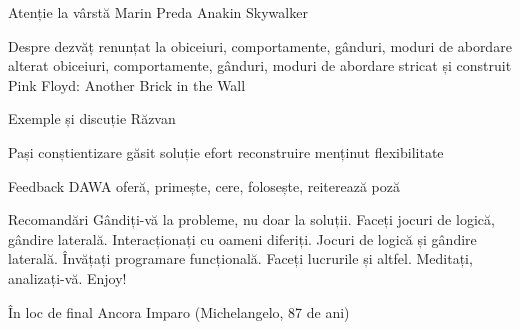 \documentclass{beamer}
\begin{document}
\begin{frame}{Atenție la vârstă}
  Marin Preda
  Anakin Skywalker
\end{frame}

\begin{frame}{Despre dezvăț}
  renunțat la obiceiuri, comportamente, gânduri, moduri de abordare
  alterat obiceiuri, comportamente, gânduri, moduri de abordare
  stricat și construit
  Pink Floyd: Another Brick in the Wall
\end{frame}

\begin{frame}{Exemple și discuție}
  Răzvan
\end{frame}

\begin{frame}{Pași}
  conștientizare
  găsit soluție
  efort
  reconstruire
  menținut flexibilitate
\end{frame}

\begin{frame}{Feedback}
  DAWA
  oferă, primește, cere, folosește, reiterează
  poză
\end{frame}

\begin{frame}{Recomandări}
  Gândiți-vă la probleme, nu doar la soluții.
  Faceți jocuri de logică, gândire laterală.
  Interacționați cu oameni diferiți.
  Jocuri de logică și gândire laterală.
  Învățați programare funcțională.
  Faceți lucrurile și altfel.
  Meditați, analizați-vă.
  Enjoy!
\end{frame}

\begin{frame}{În loc de final}
  Ancora Imparo (Michelangelo, 87 de ani)
\end{frame}
\end{document}
